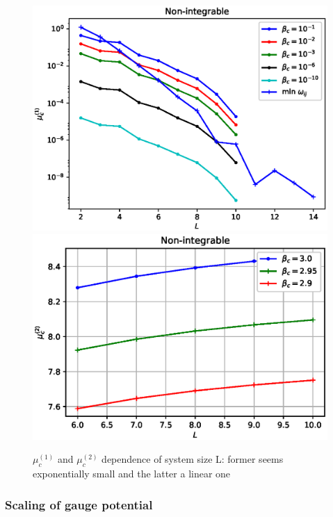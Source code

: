 \documentclass[11pt,a4paper]{article}
\begin{document}
\begin{figure}[!ht]
\begin{center}
\includegraphics[scale=0.45]{new_pics/mu_c_1_nonint.eps}
\includegraphics[scale=0.52]{new_pics/mu_c_2_nonint.eps}
\caption{$\mu_c^{(1)}$ and $\mu_c^{(2)}$ dependence of system size L: former seems exponentially small and the latter a linear one }
\label{mu_c_1_nonintegrable}
\end{center}
\end{figure}



\subsubsection*{Scaling of gauge potential}
\end{document}
